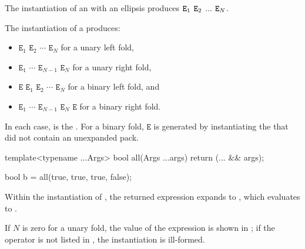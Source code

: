 \pnum
The instantiation of an  with an ellipsis
produces $\texttt{\protect E}_1$ $\texttt{\protect E}_2$ $\dotsc$ $\texttt{\protect E}_N$.

\pnum
The instantiation of a  produces:
\begin{itemize}
\item
\tcode{(}\space
\tcode{((}$\mathtt{E}_1$
            $\mathtt{E}_2$\tcode{)}
            $\cdots$\tcode{)}
            $\mathtt{E}_N$
\space\tcode{)}
for a unary left fold,
\item
\tcode{(}\space
         $\mathtt{E}_1$     
\tcode{(}$\cdots$           
\tcode{(}$\mathtt{E}_{N-1}$ 
         $\mathtt{E}_N$\tcode{))}
\space\tcode{)}
for a unary right fold,
\item
\tcode{(}\space
\tcode{(((}$\mathtt{E}$
             $\mathtt{E}_1$\tcode{)}
             $\mathtt{E}_2$\tcode{)}
             $\cdots$\tcode{)}
             $\mathtt{E}_N$
\space\tcode{)}
for a binary left fold, and
\item
\tcode{(}\space
         $\mathtt{E}_1$     
\tcode{(}$\cdots$           
\tcode{(}$\mathtt{E}_{N-1}$ 
\tcode{(}$\mathtt{E}_{N}$   
         $\mathtt{E}$\tcode{)))}
\space\tcode{)}
for a binary right fold.
\end{itemize}

In each case,
 is the .
For a binary fold,
$\mathtt{E}$ is generated
by instantiating the 
that did not contain an unexpanded pack.
\begin{example}
\begin{codeblock}
template<typename ...Args>
  bool all(Args ...args) { return (... && args); }

bool b = all(true, true, true, false);
\end{codeblock}
Within the instantiation of ,
the returned expression expands to
,
which evaluates to .
\end{example}
If $N$ is zero for a unary fold,
the value of the expression is shown in ;
if the operator is not listed in ,
the instantiation is ill-formed.

